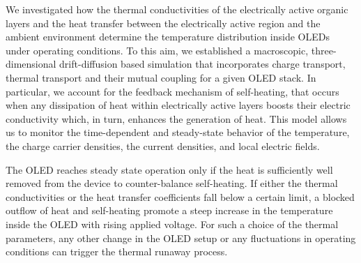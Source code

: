 \documentclass[%
9pt,
 aip,
rsi,%
 amsmath,amssymb,
preprint,%
]{revtex4-1}
\begin{document}
We investigated how the thermal conductivities of the electrically active organic layers and the heat transfer between the electrically active region and the ambient environment determine the temperature distribution inside OLEDs under operating conditions.
To this aim, we established a macroscopic, three-dimensional drift-diffusion based simulation that incorporates charge transport, thermal transport and their mutual coupling for a given OLED stack.
In particular, we account for the feedback mechanism of self-heating, that occurs when any dissipation of heat within electrically active layers boosts their electric conductivity which, in turn, enhances the generation of heat.
This model allows us to monitor the time-dependent and steady-state behavior of the temperature, the charge carrier densities, the current densities, and local electric fields.

The OLED reaches steady state operation only if the heat is sufficiently well removed from the device to counter-balance self-heating. 
If either the thermal conductivities or the heat transfer coefficients fall below a certain limit, a blocked outflow of heat and self-heating promote a steep increase in the temperature inside the OLED with rising applied voltage. 
For such a choice of the thermal parameters, any other change in the OLED setup or any fluctuations in operating conditions can trigger the thermal runaway process.

\end{document}
